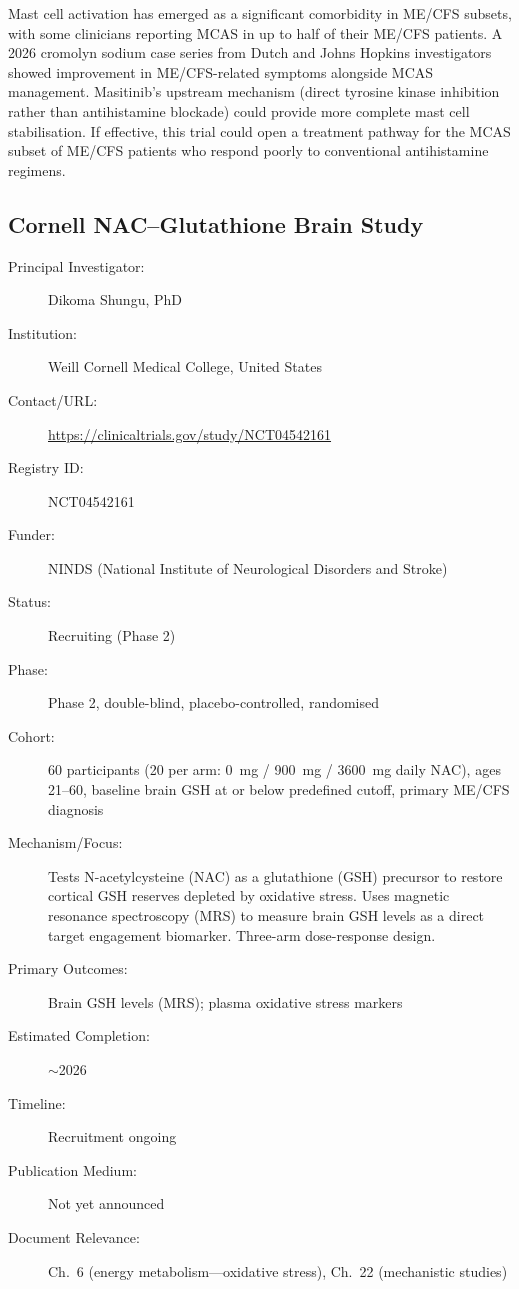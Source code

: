 Mast cell activation has emerged as a significant comorbidity in ME/CFS
subsets, with some clinicians reporting MCAS in up to half of their ME/CFS
patients.  A 2026 cromolyn sodium case series from Dutch and Johns Hopkins
investigators showed improvement in ME/CFS-related symptoms alongside MCAS
management.  Masitinib's upstream mechanism (direct tyrosine kinase
inhibition rather than antihistamine blockade) could provide more complete
mast cell stabilisation.  If effective, this trial could open a treatment
pathway for the MCAS subset of ME/CFS patients who respond poorly to
conventional antihistamine regimens.

\subsection{Cornell NAC--Glutathione Brain Study}
\label{sec:registry-cornell-nac}

\begin{description}
    \item[Principal Investigator:] Dikoma Shungu, PhD
    \item[Institution:] Weill Cornell Medical College, United States
    \item[Contact/URL:] \url{https://clinicaltrials.gov/study/NCT04542161}
    \item[Registry ID:] NCT04542161
    \item[Funder:] NINDS (National Institute of Neurological Disorders and
        Stroke)
    \item[Status:] Recruiting (Phase 2)
    \item[Phase:] Phase 2, double-blind, placebo-controlled, randomised
    \item[Cohort:] 60 participants (20 per arm: 0~mg / 900~mg / 3600~mg
        daily NAC), ages 21--60, baseline brain GSH at or below predefined
        cutoff, primary ME/CFS diagnosis
    \item[Mechanism/Focus:] Tests N-acetylcysteine (NAC) as a glutathione
        (GSH) precursor to restore cortical GSH reserves depleted by
        oxidative stress.  Uses magnetic resonance spectroscopy (MRS) to
        measure brain GSH levels as a direct target engagement biomarker.
        Three-arm dose-response design.
    \item[Primary Outcomes:] Brain GSH levels (MRS); plasma oxidative stress
        markers
    \item[Estimated Completion:] $\sim$2026
    \item[Timeline:] Recruitment ongoing
    \item[Publication Medium:] Not yet announced
    \item[Document Relevance:] Ch.~6 (energy metabolism---oxidative stress),
        Ch.~22 (mechanistic studies)
\end{description}

